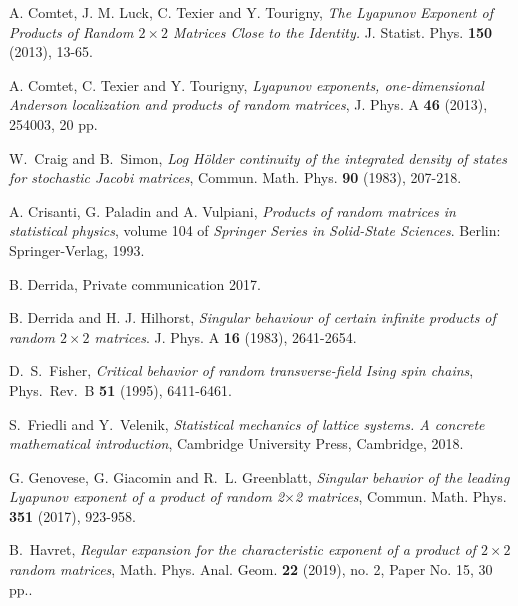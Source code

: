 \documentclass[reqno,11pt]{amsart}
\numberwithin{equation}{section}
\begin{document}
\begin{thebibliography}{99}
A. Comtet, J. M.  Luck, C. Texier and Y.
 Tourigny, 
 \emph{The Lyapunov Exponent of Products of Random $2\times 2$ Matrices Close to the Identity.}
  J. Statist. Phys. {\bf 150} (2013), 13-65.
  
 A. Comtet, C. Texier and  Y. Tourigny, 
\emph{Lyapunov exponents, one-dimensional Anderson localization and products of random matrices}, 
J. Phys. A {\bf 46} (2013), 254003, 20 pp.  

W.~Craig and B.~Simon, \emph{Log H\"older continuity of the integrated density of states for stochastic Jacobi matrices}, 
{Commun. Math. Phys.} \textbf{90} (1983), 207-218. 


A. Crisanti, G. Paladin and A. Vulpiani, 
\newblock \emph{{Products of random matrices in statistical physics}}, volume
  104 of \emph{{Springer Series in Solid-State Sciences}}.
\newblock Berlin: Springer-Verlag, 1993.

B. Derrida, Private communication 2017.
 
 
B. Derrida and H. J. Hilhorst, 
\emph{Singular behaviour of certain infinite products of random {$2\times 2$} matrices}.
J. Phys. A \textbf{16} (1983), 2641-2654. 



	D.~S.~Fisher, \emph{Critical behavior of random transverse-field Ising spin chains}, Phys.\ Rev.\ B \textbf{51} (1995), 6411-6461.

S.~Friedli and Y.~Velenik, \emph{Statistical mechanics of lattice systems. A concrete mathematical introduction}, Cambridge University Press, Cambridge, 2018. 


G. Genovese,   G. Giacomin and R.~L.  Greenblatt, 
\emph{Singular behavior of the leading Lyapunov exponent of a product of random 2$\times$2 matrices},
{Commun. Math. Phys.} \textbf{351} (2017), 923-958. 

 B.~Havret, \emph{Regular expansion for the characteristic exponent of a product of $2 \times 2$ random matrices},  
Math. Phys. Anal. Geom. {\bf 22} (2019), no. 2, Paper No. 15, 30 pp..


\end{thebibliography}
\end{document}
